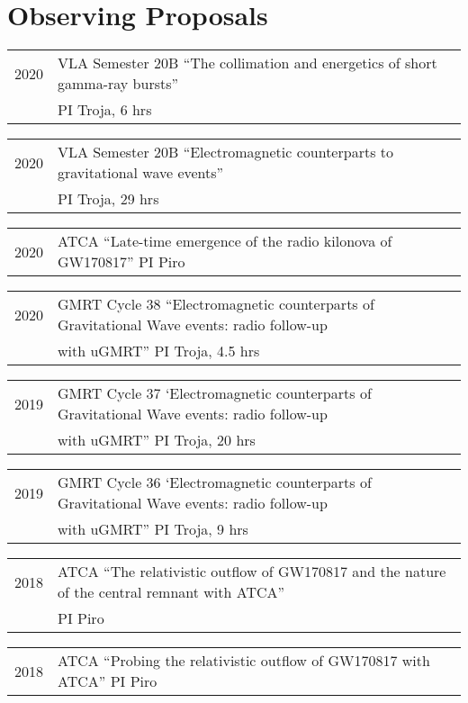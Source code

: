 \documentclass[letterpaper]{article}
\renewenvironment{itemize}{
  \begin{list}{}{
    \setlength{\leftmargin}{1.5em}
  }
}{
  \end{list}
}
\begin{document}
\section*{Observing Proposals}
\begin{itemize}
\item \begin{tabular}{ll}
2020	& VLA Semester 20B ``The collimation and energetics of short gamma-ray bursts''\\
	&  PI Troja, 6 hrs
\end{tabular}
\item \begin{tabular}{ll}
2020	& VLA Semester 20B ``Electromagnetic counterparts to gravitational wave events''\\
	&  PI Troja, 29 hrs
\end{tabular}
\item \begin{tabular}{ll}
2020	& ATCA ``Late-time emergence of the radio kilonova of GW170817'' PI Piro
\end{tabular}
\item \begin{tabular}{ll}
2020	& GMRT Cycle 38 ``Electromagnetic counterparts of Gravitational Wave events: radio follow-up\\
	&  with uGMRT'' PI Troja, 4.5 hrs
\end{tabular}
\item \begin{tabular}{ll}
2019	& GMRT Cycle 37 `Electromagnetic counterparts of Gravitational Wave events: radio follow-up\\
	&  with uGMRT'' PI Troja, 20 hrs
\end{tabular}
\item \begin{tabular}{ll}
2019	& GMRT Cycle 36 `Electromagnetic counterparts of Gravitational Wave events: radio follow-up\\
	&  with uGMRT'' PI Troja, 9 hrs
\end{tabular}
\item \begin{tabular}{ll}
2018	& ATCA ``The relativistic outflow of GW170817 and the nature of the central remnant with ATCA''\\
	&  PI Piro
\end{tabular}
\item \begin{tabular}{ll}
2018	& ATCA ``Probing the relativistic outflow of GW170817 with ATCA'' PI Piro

\end{tabular}
\end{itemize}
\end{document}

